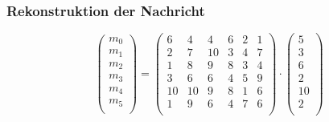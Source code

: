 \documentclass[11pt,aspectratio=169]{beamer}
\begin{document}
	\begin{frame}
		\frametitle{Rekonstruktion der Nachricht}
		
		\[
		\begin{pmatrix}
			m_0 \\ m_1 \\ m_2 \\ m_3 \\ m_4 \\ m_5 \\
		\end{pmatrix}
		=
		\begin{pmatrix}
			6&  4&  4&  6& 2&  1\\
			2&  7& 10&  3& 4&  7\\
			1&  8&  9&  8& 3&  4\\
			3&  6&  6&  4& 5&  9\\
			10& 10&  9&  8& 1&  6\\
			1&  9&  6&  4& 7&  6\\
		\end{pmatrix}
		\cdot
		\begin{pmatrix}
			5 \\ 3 \\ 6 \\ 2 \\ 10 \\ 2 \\
		\end{pmatrix}
		\]
		
		\begin{itemize}
		\end{itemize}
		
	\end{frame}
\end{document}
